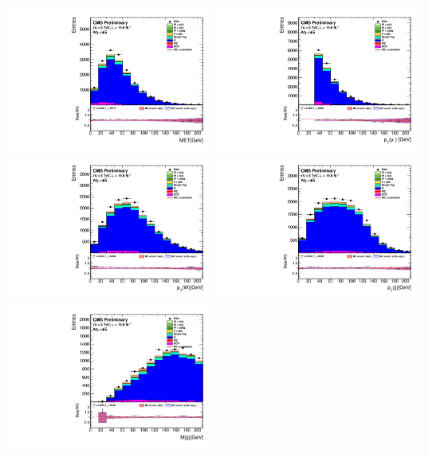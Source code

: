 \begin{figure}[htbp]
	\centering
		\includegraphics[width=0.48\textwidth]{Figures/Results/Muon/prefit/TT_GetMET_doQCD1.pdf}
		\includegraphics[width=0.48\textwidth]{Figures/Results/Muon/prefit/TT_vLepton_pt_doQCD1.pdf}
		\includegraphics[width=0.48\textwidth]{Figures/Results/Muon/prefit/TT_GetWpt_doQCD1.pdf}
		\includegraphics[width=0.48\textwidth]{Figures/Results/Muon/prefit/TT_H_pt_doQCD1.pdf}
		\includegraphics[width=0.48\textwidth]{Figures/Results/Muon/prefit/TT_H_mass_doQCD1.pdf}

\end{figure}
